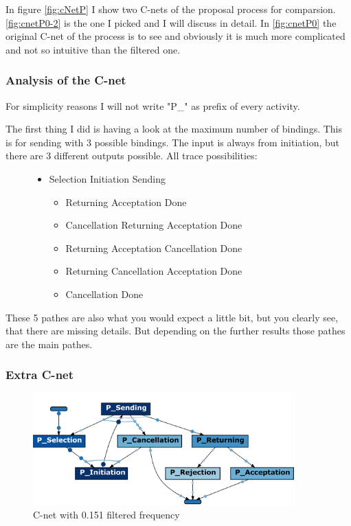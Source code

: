 In figure \ref{fig:cNetP} I show two C-nets of the proposal process for comparsion. \ref{fig:cnetP0-2} is the one I picked and I will discuss in detail. In \ref{fig:cnetP0} the original C-net of the process is to see and obviously it is much more complicated and not so intuitive than the filtered one. 

\subsubsection{Analysis of the C-net}
For simplicity reasons I will not write "P\_" as prefix of every activity.

The first thing I did is having a look at the maximum number of bindings. This is for sending with 3 possible bindings. The input is always from initiation, but there are 3 different outputs possible.
All trace possibilities:
\begin{figure}[!htbp]
\begin{itemize}
	\item Selection \textrightarrow Initiation \textrightarrow Sending \textrightarrow
	\begin{itemize}
	\item  Returning \textrightarrow Acceptation \textrightarrow Done
	\item Cancellation \textrightarrow Returning \textrightarrow Acceptation \textrightarrow Done
	\item  Returning \textrightarrow Acceptation \textrightarrow Cancellation  \textrightarrow Done
	\item  Returning \textrightarrow Cancellation \textrightarrow Acceptation \textrightarrow Done
	\item Cancellation \textrightarrow Done
	\end{itemize}
\end{itemize}
\end{figure}

These 5 pathes are also what you would expect a little bit, but you clearly see, that there are missing details. But depending on the further results those pathes are the main pathes.

\subsubsection{Extra C-net}

\begin{figure}[!htbp]
\centering
\includegraphics[width=0.9\textwidth]{PropC-Net0-151.PNG}
\caption{C-net with 0.151 filtered frequency}
\label{fig:cnet0-151}
\end{figure}


